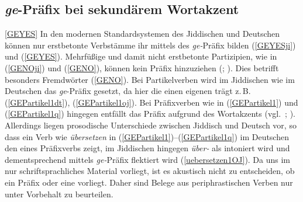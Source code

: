 \subsection{{\textit{ge}-Präfix} bei sekundärem Wortakzent}\label{ge}
\ref{GEYES}
In den modernen Standardsystemen des Jiddischen und Deutschen können nur erstbetonte Verbstämme ihr  mittels des \textit{ge-}Präfix bilden 
(\ref{GEYESji}) und (\ref{GEYES}).
Mehrfüßige und damit nicht erstbetonte Partizipien, wie in 
(\ref{GENOji}) und (\ref{GENO}), %
 können kein Präfix hinzuziehen (\citealt[213]{Jacobs2005}; \citealt[92]{Wiese2000}). Dies betrifft besonders Fremdwörter 
 (\ref{GENO}). 
 Bei Partikelverben wird im Jiddischen wie im Deutschen das {\textit{ge}}-Präfix gesetzt, da hier die  einen eigenen  trägt z.\,B.\, (\ref{GEPartikel1dt}), (\ref{GEPartikel1oj}). Bei Präfixverben wie in (\ref{GEPartikel1}) und (\ref{GEPartikel1q}) hingegen entfällt das Präfix aufgrund des Wortakzents (vgl.\, \citealt[213]{Jacobs2005}; \citealt[92]{Wiese2000}). Allerdings liegen prosodische Unterschiede zwischen Jiddisch und Deutsch vor, so dass ein Verb  wie \textit{übersetzen} in (\ref{GEPartikel1})–(\ref{GEPartikel1q}) im Deutschen den  eines Präfixverbs zeigt, im Jiddischen hingegen \textit{über-} als  intoniert wird und dementsprechend mittels \textit{ge-}Präfix flektiert wird (\ref{uebersetzen1OJ}). Da uns im \hai{{\LiJi}} nur schriftsprachliches Material vorliegt, ist es akustisch nicht zu entscheiden, ob ein Präfix oder eine  vorliegt. Daher sind Belege aus periphrastischen Verben nur unter Vorbehalt zu beurteilen.

